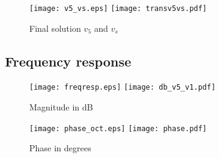 \begin{figure}[h] \centering
\texttt{[image: v5\_vs.eps]}
\texttt{[image: transv5vs.pdf]}
\caption{Final solution $v_5$ and $v_s$}
\label{fig:comparison4}
\end{figure}
\FloatBarrier

\subsection{Frequency response}

\begin{figure}[h] \centering
\texttt{[image: freqresp.eps]}
\texttt{[image: db\_v5\_v1.pdf]}
\caption{Magnitude in dB}
\label{fig:comparison5}
\end{figure}
\FloatBarrier

\begin{figure}[h] \centering
\texttt{[image: phase\_oct.eps]}
\texttt{[image: phase.pdf]}
\caption{Phase in degrees}
\label{fig:comparison6}
\end{figure}
\FloatBarrier


